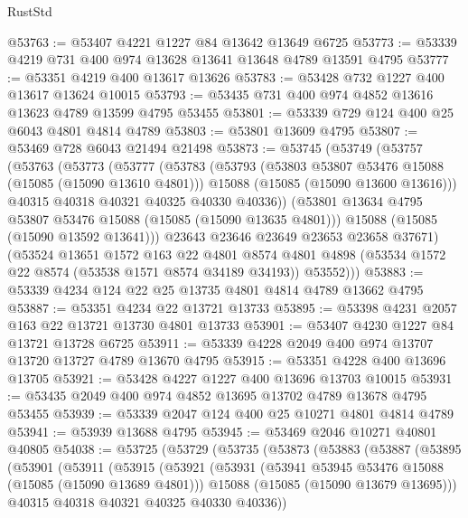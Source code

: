 \begin{lexlean}{RustStd}
\begin{coremodule}
@53763 := @53407 @4221 @1227 @84 @13642 @13649 @6725
@53773 := @53339 @4219 @731 @400 @974 @13628 @13641 @13648 @4789 @13591 @4795
@53777 := @53351 @4219 @400 @13617 @13626
@53783 := @53428 @732 @1227 @400 @13617 @13624 @10015
@53793 := @53435 @731 @400 @974 @4852 @13616 @13623 @4789 @13599 @4795 @53455
@53801 := @53339 @729 @124 @400 @25 @6043 @4801 @4814 @4789
@53803 := @53801 @13609 @4795
@53807 := @53469 @728 @6043 @21494 @21498
@53873 := @53745
    (@53749
      (@53757
        (@53763
          (@53773
            (@53777
              (@53783
                (@53793
                  (@53803 @53807 @53476 @15088 (@15085 (@15090 @13610 @4801)))
                  @15088
                  (@15085 (@15090 @13600 @13616)))
                @40315
                @40318
                @40321
                @40325
                @40330
                @40336))
            (@53801 @13634 @4795 @53807 @53476 @15088 (@15085 (@15090 @13635 @4801)))
            @15088
            (@15085 (@15090 @13592 @13641)))
          @23643
          @23646
          @23649
          @23653
          @23658
          @37671)
        (@53524
          @13651
          @1572
          @163
          @22
          @4801
          @8574
          @4801
          @4898
          (@53534 @1572 @22 @8574 (@53538 @1571 @8574 @34189 @34193))
          @53552)))
@53883 := @53339 @4234 @124 @22 @25 @13735 @4801 @4814 @4789 @13662 @4795
@53887 := @53351 @4234 @22 @13721 @13733
@53895 := @53398 @4231 @2057 @163 @22 @13721 @13730 @4801 @13733
@53901 := @53407 @4230 @1227 @84 @13721 @13728 @6725
@53911 := @53339 @4228 @2049 @400 @974 @13707 @13720 @13727 @4789 @13670 @4795
@53915 := @53351 @4228 @400 @13696 @13705
@53921 := @53428 @4227 @1227 @400 @13696 @13703 @10015
@53931 := @53435 @2049 @400 @974 @4852 @13695 @13702 @4789 @13678 @4795 @53455
@53939 := @53339 @2047 @124 @400 @25 @10271 @4801 @4814 @4789
@53941 := @53939 @13688 @4795
@53945 := @53469 @2046 @10271 @40801 @40805
@54038 := @53725
    (@53729
      (@53735
        (@53873
          (@53883
            (@53887
              (@53895
                (@53901
                  (@53911
                    (@53915
                      (@53921
                        (@53931
                          (@53941 @53945 @53476 @15088 (@15085 (@15090 @13689 @4801)))
                          @15088
                          (@15085 (@15090 @13679 @13695)))
                        @40315
                        @40318
                        @40321
                        @40325
                        @40330
                        @40336))

\end{coremodule}
\end{lexlean}
